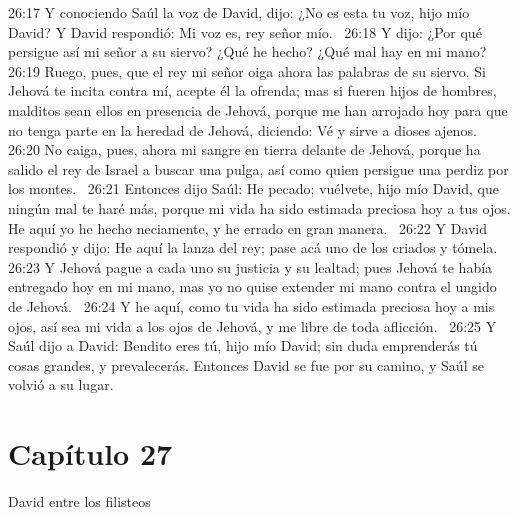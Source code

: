 26:17 Y conociendo Saúl la voz de David, dijo: ¿No es esta tu voz, hijo mío David? Y David respondió: Mi voz es, rey señor mío.  
26:18 Y dijo: ¿Por qué persigue así mi señor a su siervo? ¿Qué he hecho? ¿Qué mal hay en mi mano?  
26:19 Ruego, pues, que el rey mi señor oiga ahora las palabras de su siervo. Si Jehová te incita contra mí, acepte él la ofrenda; mas si fueren hijos de hombres, malditos sean ellos en presencia de Jehová, porque me han arrojado hoy para que no tenga parte en la heredad de Jehová, diciendo: Vé y sirve a dioses ajenos.  
26:20 No caiga, pues, ahora mi sangre en tierra delante de Jehová, porque ha salido el rey de Israel a buscar una pulga, así como quien persigue una perdiz por los montes.  
26:21 Entonces dijo Saúl: He pecado; vuélvete, hijo mío David, que ningún mal te haré más, porque mi vida ha sido estimada preciosa hoy a tus ojos. He aquí yo he hecho neciamente, y he errado en gran manera.  
26:22 Y David respondió y dijo: He aquí la lanza del rey; pase acá uno de los criados y tómela.  
26:23 Y Jehová pague a cada uno su justicia y su lealtad; pues Jehová te había entregado hoy en mi mano, mas yo no quise extender mi mano contra el ungido de Jehová.  
26:24 Y he aquí, como tu vida ha sido estimada preciosa hoy a mis ojos, así sea mi vida a los ojos de Jehová, y me libre de toda aflicción.  
26:25 Y Saúl dijo a David: Bendito eres tú, hijo mío David; sin duda emprenderás tú cosas grandes, y prevalecerás. Entonces David se fue por su camino, y Saúl se volvió a su lugar.  
\section*{Capítulo 27 }
David entre los filisteos  

